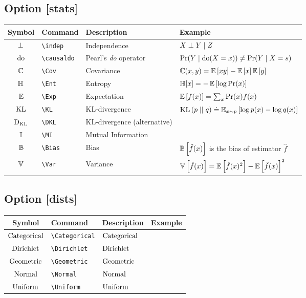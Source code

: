 \documentclass{article}
\begin{document}
\subsection*{Option [stats]}

\begin{tabular}{clll}
  \toprule
  Symbol & Command & Description & Example \\
  \midrule
  $\mathrel{\bot}$ & \verb|\indep| & Independence & $X \mathrel{\bot} Y \mid Z$ \\
  \midrule
  $\operatorname{do}$ & \verb|\causaldo| & Pearl's \emph{do} operator & $\Pr(Y\mid \operatorname{do}(X=x)) \neq \Pr(Y\mid X=s)$ \\
  \midrule
  $\operatorname{\mathbb{C}}$ & \verb|\Cov| & Covariance & $\operatorname{\mathbb{C}}(x, y) = \operatorname{\mathbb{E}}\left[xy\right] - \operatorname{\mathbb{E}}\left[x\right] \operatorname{\mathbb{E}}\left[y\right]$ \\
  $\operatorname{\mathbb{H}}$ & \verb|\Ent| & Entropy & $\operatorname{\mathbb{H}}[x] = -\operatorname{\mathbb{E}}\left[\log\Pr(x) \right]$ \\
  $\operatorname{\mathbb{E}}$ & \verb|\Exp| & Expectation & $\operatorname{\mathbb{E}}\left[ f(x) \right] = \sum_x \Pr(x) f(x)$ \\
  $\operatorname{KL}$ & \verb|\KL| & KL-divergence & $\operatorname{KL}\left( p \mid\mid q\right) \doteq \operatorname{\mathbb{E}}_{x\sim p}\left[ \log p(x) - \log q(x) \right]$ \\
  $\operatorname{{D_\text{KL}}}$ & \verb|\DKL| & KL-divergence (alternative) & \\
  $\operatorname{\mathbb{I}}$ & \verb|\MI| & Mutual Information & \\
  $\operatorname{\mathbb{B}}$ & \verb|\Bias| & Bias & $\operatorname{\mathbb{B}}\left[\hat f(x)\right]$ is the bias of estimator $\hat f$ \\
  $\operatorname{\mathbb{V}}$ & \verb|\Var| & Variance & $\operatorname{\mathbb{V}}\left[\hat f(x)\right] = \operatorname{\mathbb{E}}\left[\hat f(x)^2\right] - \operatorname{\mathbb{E}}\left[ \hat f(x)\right]^2$ \\
  \bottomrule
\end{tabular}

\subsection*{Option [dists]}

\begin{tabular}{clll}
  \toprule
  Symbol & Command & Description & Example \\
  \midrule
  $\operatorname{Categorical}$ & \verb|\Categorical| & $\operatorname{Categorical}$ \\
  $\operatorname{Dirichlet}$ & \verb|\Dirichlet| & $\operatorname{Dirichlet}$ \\
  $\operatorname{Geometric}$ & \verb|\Geometric| & $\operatorname{Geometric}$ \\
  $\operatorname{Normal}$ & \verb|\Normal| & $\operatorname{Normal}$ \\
  $\operatorname{Uniform}$ & \verb|\Uniform| & $\operatorname{Uniform}$ \\
  \bottomrule
\end{tabular}
\end{document}
